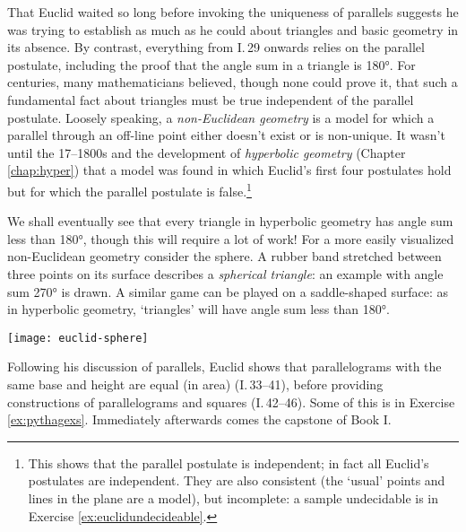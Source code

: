 That Euclid waited so long before invoking the uniqueness of parallels suggests he was trying to establish as much as he could about triangles and basic geometry in its absence. By contrast, everything from I.\,29 onwards relies on the parallel postulate, including the proof that the angle sum in a triangle is \ang{180}. For centuries, many mathematicians believed, though none could prove it, that such a fundamental fact about triangles must be true independent of the parallel postulate.\smallbreak
Loosely speaking, a \emph{non-Euclidean geometry} is a model for which a parallel through an off-line point either doesn't exist or is non-unique. It wasn't until the 17--1800s and the development of \emph{hyperbolic geometry} (Chapter \ref{chap:hyper}) that a model was found in which Euclid's first four postulates hold but for which the parallel postulate is false.\footnote{This shows that the parallel postulate is independent; in fact all Euclid's postulates are independent. They are also consistent (the `usual' points and lines in the plane are a model), but incomplete: a sample undecidable is in Exercise \ref{ex:euclidundecideable}.}\par

\begin{minipage}[t]{0.76\linewidth}\vspace{-5pt}
	We shall eventually see that every triangle in hyperbolic geometry has angle sum less than \ang{180}, though this will require a lot of work! For a more easily visualized non-Euclidean geometry consider the sphere. A rubber band stretched between three points on its surface describes a \emph{spherical triangle}: an example with angle sum \ang{270} is drawn. A similar game can be played on a saddle-shaped surface: as in hyperbolic geometry, `triangles' will have angle sum less than \ang{180}.
\end{minipage}
\hfill
\begin{minipage}[t]{0.23\linewidth}\vspace{-10pt}
	\flushright
	\texttt{[image: euclid-sphere]}
\end{minipage}

\goodbreak

\goodbreak



Following his discussion of parallels, Euclid shows that parallelograms with the same base and height are equal (in area) (I.\,33--41), before providing constructions of parallelograms and squares (I.\,42--46). Some of this is in Exercise \ref{ex:pythagexs}. Immediately afterwards comes the capstone of Book I.


